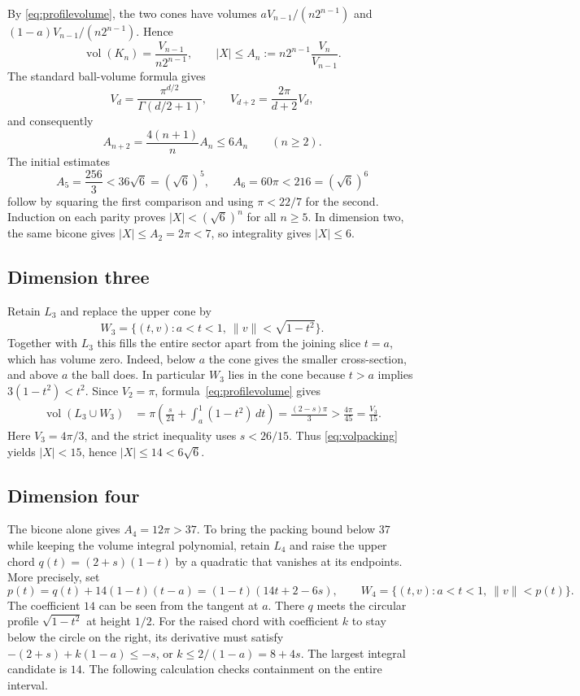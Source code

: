 \documentclass[11pt,a4paper]{article}
\theoremstyle{remark}
\newcommand{\vol}{\operatorname{vol}}
\begin{document}
By \eqref{eq:profilevolume}, the two cones have volumes
$aV_{n-1}/(n2^{n-1})$ and $(1-a)V_{n-1}/(n2^{n-1})$. Hence
\begin{equation}\label{eq:bicone}
 \vol(K_n)=\frac{V_{n-1}}{n2^{n-1}},\qquad
 |X|\leq A_n:=n2^{n-1}\frac{V_n}{V_{n-1}}.
\end{equation}
The standard ball-volume formula gives
\begin{equation}\label{eq:ballrecurrence}
 V_d=\frac{\pi^{d/2}}{\Gamma(d/2+1)},\qquad
 V_{d+2}=\frac{2\pi}{d+2}V_d,
\end{equation}
and consequently
\begin{equation}\label{eq:Anrecurrence}
 A_{n+2}=\frac{4(n+1)}{n}A_n\leq6A_n\qquad(n\geq2).
\end{equation}
The initial estimates
\[
 A_5=\frac{256}{3}<36\sqrt6=(\sqrt6)^5,\qquad
 A_6=60\pi<216=(\sqrt6)^6
\]
follow by squaring the first comparison and using $\pi<22/7$ for the second. Induction on each parity proves $|X|<(\sqrt6)^n$ for all $n\geq5$. In dimension two, the same bicone gives $|X|\leq A_2=2\pi<7$, so integrality gives $|X|\leq6$.

\subsection{Dimension three}

Retain $L_3$ and replace the upper cone by
\[
 W_3=\{(t,v):a<t<1,\ \|v\|<\sqrt{1-t^2}\}.
\]
Together with $L_3$ this fills the entire sector apart from the joining slice $t=a$, which has volume zero. Indeed, below $a$ the cone gives the smaller cross-section, and above $a$ the ball does. In particular $W_3$ lies in the cone because $t>a$ implies $3(1-t^2)<t^2$. Since $V_2=\pi$, formula~\eqref{eq:profilevolume} gives
\begin{align*}
 \vol(L_3\cup W_3)
 &=\pi\left(\frac{s}{24}+\int_a^1(1-t^2)\,dt\right)
 =\frac{(2-s)\pi}{3}
 >\frac{4\pi}{45}=\frac{V_3}{15}.
\end{align*}
Here $V_3=4\pi/3$, and the strict inequality uses $s<26/15$. Thus \eqref{eq:volpacking} yields $|X|<15$, hence $|X|\leq14<6\sqrt6$.

\subsection{Dimension four}\label{sec:four}

The bicone alone gives $A_4=12\pi>37$. To bring the packing bound below $37$ while keeping the volume integral polynomial, retain $L_4$ and raise the upper chord $q(t)=(2+s)(1-t)$ by a quadratic that vanishes at its endpoints. More precisely, set
\[
 p(t)=q(t)+14(1-t)(t-a)=(1-t)(14t+2-6s),\qquad
 W_4=\{(t,v):a<t<1,\ \|v\|<p(t)\}.
\]
The coefficient $14$ can be seen from the tangent at $a$. There $q$ meets the circular profile $\sqrt{1-t^2}$ at height $1/2$. For the raised chord with coefficient $k$ to stay below the circle on the right, its derivative must satisfy $-(2+s)+k(1-a)\leq-s$, or $k\leq 2/(1-a)=8+4s$. The largest integral candidate is $14$. The following calculation checks containment on the entire interval.
\end{document}
